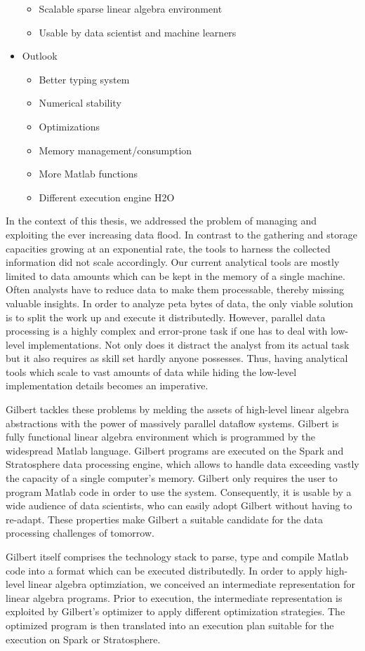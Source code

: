 \begin{itemize}
	\begin{itemize}
		\item Scalable sparse linear algebra environment
		\item Usable by data scientist and machine learners
	\end{itemize}
	\item Outlook
	\begin{itemize}
		\item Better typing system
		\item Numerical stability
		\item Optimizations
		\item Memory management/consumption
		\item More Matlab functions
		\item Different execution engine H2O
	\end{itemize}
\end{itemize}


In the context of this thesis, we addressed the problem of managing and exploiting the ever increasing data flood.
In contrast to the gathering and storage capacities growing at an exponential rate, the tools to harness the collected information did not scale accordingly.
Our current analytical tools are mostly limited to data amounts which can be kept in the memory of a single machine.
Often analysts have to reduce data to make them processable, thereby missing valuable insights.
In order to analyze peta bytes of data, the only viable solution is to split the work up and execute it distributedly.
However, parallel data processing is a highly complex and error-prone task if one has to deal with low-level implementations.
Not only does it distract the analyst from its actual task but it also requires as skill set hardly anyone possesses.
Thus, having analytical tools which scale to vast amounts of data while hiding the low-level implementation details becomes an imperative.

Gilbert tackles these problems by melding the assets of high-level linear algebra abstractions with the power of massively parallel dataflow systems.
Gilbert is fully functional linear algebra environment which is programmed by the widespread Matlab language.
Gilbert programs are executed on the Spark and Stratosphere data processing engine, which allows to handle data exceeding vastly the capacity of a single computer's memory.
Gilbert only requires the user to program Matlab code in order to use the system.
Consequently, it is usable by a wide audience of data scientists, who can easily adopt Gilbert without having to re-adapt.
These properties make Gilbert a suitable candidate for the data processing challenges of tomorrow.

Gilbert itself comprises the technology stack to parse, type and compile Matlab code into a format which can be executed distributedly.
In order to apply high-level linear algebra optimziation, we conceived an intermediate representation for linear algebra programs.
Prior to execution, the intermediate representation is exploited by Gilbert's optimizer to apply different optimization strategies.
The optimized program is then translated into an execution plan suitable for the execution on Spark or Stratosphere.


